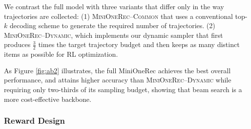 We contrast the full model with three variants that differ only in the way trajectories are collected:
(1) \textsc{MiniOneRec}--\textsc{Common} that uses a conventional top-$k$ decoding scheme to generate the required number of trajectories.
(2) \textsc{MiniOneRec}--\textsc{Dynamic}, which implements our dynamic sampler that first produces $\tfrac32$ times the target trajectory budget and then keeps as many distinct items as possible for RL optimization.

As Figure \ref{fig:ab2} illustrates, the full MiniOneRec achieves the best overall performance, and attains higher accuracy than \textsc{MiniOneRec}--\textsc{Dynamic} while requiring only two-thirds of its sampling budget, showing that beam search is a more cost-effective backbone.

\subsubsection{Reward Design}

